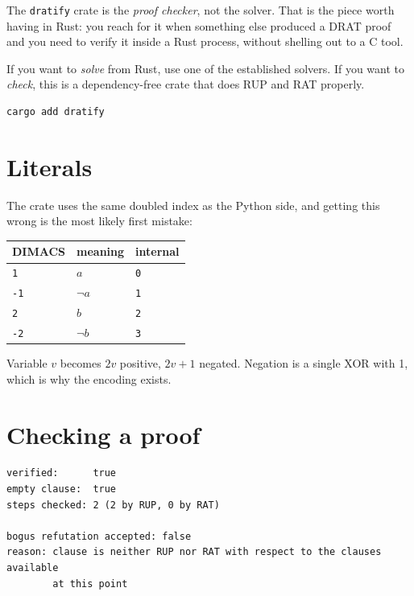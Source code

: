 \documentclass[11pt,a4paper]{article}
\newcommand{\pkg}[1]{\texttt{#1}}
\begin{document}
The \pkg{dratify} crate is the \emph{proof checker}, not the solver. That is
the piece worth having in Rust: you reach for it when something else produced a
DRAT proof and you need to verify it inside a Rust process, without shelling
out to a C tool.

If you want to \emph{solve} from Rust, use one of the established solvers. If
you want to \emph{check}, this is a dependency-free crate that does RUP and RAT
properly.

\begin{lstlisting}[style=base]
cargo add dratify
\end{lstlisting}

\section{Literals}

The crate uses the same doubled index as the Python side, and getting this
wrong is the most likely first mistake:

\begin{center}
\begin{tabular}{lll}
\toprule
DIMACS & meaning & internal \\
\midrule
\texttt{1}  & $a$       & \texttt{0} \\
\texttt{-1} & $\lnot a$ & \texttt{1} \\
\texttt{2}  & $b$       & \texttt{2} \\
\texttt{-2} & $\lnot b$ & \texttt{3} \\
\bottomrule
\end{tabular}
\end{center}

Variable $v$ becomes $2v$ positive, $2v{+}1$ negated. Negation is a single XOR
with 1, which is why the encoding exists.

\section{Checking a proof}



\begin{lstlisting}[style=out]
verified:      true
empty clause:  true
steps checked: 2 (2 by RUP, 0 by RAT)

bogus refutation accepted: false
reason: clause is neither RUP nor RAT with respect to the clauses available
        at this point
\end{lstlisting}
\end{document}
